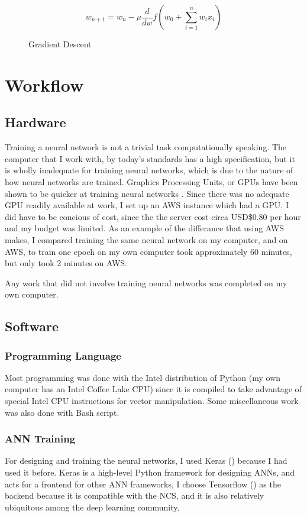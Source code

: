           \begin{figure}[h]
            \[
                w_{n+1}=w_n-\mu \frac{d}{dw}f(w_0+\sum_{i=1}^nw_ix_i)
            \]
            \caption{Gradient Descent}
            \label{fig:gradientdescent}
            \end{figure}

\section{Workflow}
    \subsection{Hardware}
    Training a neural network is not a trivial task computationally speaking. The computer that I work with, by today's standards has a high specification, but it is wholly inadequate for training neural networks, which is due to the nature of how neural networks are trained. Graphics Processing Units, or GPUs have been shown to be quicker at training neural networks \cite{OH20041311}. Since there was no adequate GPU readily available at work, I set up an AWS instance which had a GPU. I did have to be concious of cost, since the the server cost circa USD\$0.80 per hour and my budget was limited. As an example of the differance that using AWS makes, I compared training the same neural network on my computer, and on AWS, to train one epoch on my own computer took approximately 60 minutes, but only took 2 minutes on AWS.

    Any work that did not involve training neural networks was completed on my own computer.

    \subsection{Software}
        \subsubsection{Programming Language}
        Most programming was done with the Intel distribution of Python (my own computer has an Intel Coffee Lake CPU) since it is compiled to take advantage of special Intel CPU instructions for vector manipulation. Some miscellaneous work was also done with Bash script.

        \subsubsection{ANN Training}
        For designing and training the neural networks, I used Keras (\cite{chollet2015keras}) because I had used it before. Keras is a high-level Python framework for designing ANNs, and acts for a frontend for other ANN frameworks, I choose Tensorflow (\cite{tensorflow2015-whitepaper}) as the backend because it is compatible with the NCS, and it is also relatively ubiquitous among the deep learning community.

